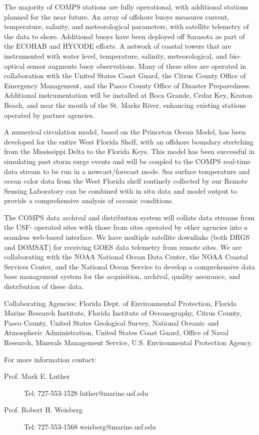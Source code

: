 The majority of COMPS stations are fully operational, with additional
stations planned for the near future. An array of offshore buoys
measures current, temperature, salinity, and meteorological
parameters, with satellite telemetry of the data to shore. Additional
buoys have been deployed off Sarasota as part of the ECOHAB and HYCODE
efforts.  A network of coastal towers that are instrumented with water
level, temperature, salinity, meteorological, and bio- optical sensor
augments buoy observations. Many of these sites are operated in
collaboration with the United States Coast Guard, the Citrus County
Office of Emergency Management, and the Pasco County Office of
Disaster Preparedness. Additional instrumentation will be installed at
Boca Grande, Cedar Key, Keaton Beach, and near the mouth of the St.
Marks River, enhancing existing stations operated by partner agencies.

A numerical circulation model, based on the Princeton Ocean Model, has
been developed for the entire West Florida Shelf, with an offshore
boundary stretching from the Mississippi Delta to the Florida Keys.
This model has been successful in simulating past storm surge events
and will be coupled to the COMPS real-time data stream to be run in a
nowcast/forecast mode. Sea surface temperature and ocean color data
from the West Florida shelf routinely collected by our Remote Sensing
Laboratory can be combined with in situ data and model output to
provide a comprehensive analysis of oceanic conditions.

The COMPS data archival and distribution system will collate data
streams from the USF- operated sites with those from sites operated by
other agencies into a seamless web-based interface.  We have multiple
satellite downlinks (both DRGS and DOMSAT) for receiving GOES data
telemetry from remote sites.  We are collaborating with the NOAA
National Ocean Data Center, the NOAA Coastal Services Center, and the
National Ocean Service to develop a comprehensive data base management
system for the acquisition, archival, quality assurance, and
distribution of these data.

Collaborating Agencies: Florida Dept. of Environmental Protection, Florida Marine Research 
Institute, Florida Institute of Oceanography, Citrus County, Pasco County, United States 
Geological Survey, National Oceanic and Atmospheric Administration, United States Coast 
Guard, Office of Naval Research, Minerals Management Service, U.S. Environmental Protection 
Agency.

For more information contact:
\begin{description}
\item[Prof. Mark E. Luther]
Tel: 727-553-1528               
luther@marine.usf.edu           

\item[Prof. Robert H. Weisberg]
Tel: 727-553-1568
weisberg@marine.usf.edu
\end{description}


